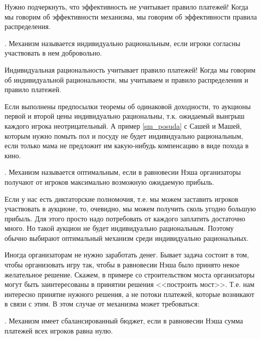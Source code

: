 Нужно подчеркнуть, что эффективность не учитывает правило платежей! Когда мы говорим об эффективности механизма, мы говорим об эффективности правила распределения.

\begin{mydef}
. Механизм называется индивидуально рациональным, если игроки согласны участвовать в нем добровольно. 
\end{mydef}

Индивидуальная рациональность учитывает правило платежей! Когда мы говорим об индивидуальной рациональности, мы учитываем и правило распределения и правило платежей.

\begin{myex} Если выполнены предпосылки теоремы об одинаковой доходности, то аукционы первой и второй цены индивидуально рациональны, т.к. ожидаемый выигрыш каждого игрока неотрицательный. А пример \ref{sm_posuda} с Сашей и Машей, которым нужно помыть пол и посуду не будет индивидуально рациональным, если только мама не предложит им какую-нибудь компенсацию в виде похода в кино.
\end{myex}

\begin{mydef} . Механизм называется оптимальным, если в равновесии Нэша организаторы получают от игроков максимально возможную ожидаемую прибыль.
\end{mydef}

Если у нас есть диктаторские полномочия, т.е. мы можем заставить игроков участвовать в аукционе, то, очевидно, мы можем получить сколь угодно большую прибыль. Для этого просто надо потребовать от каждого заплатить достаточно много. Но такой аукцион не будет индивидуально рациональным. Поэтому обычно выбирают оптимальный механизм среди индивидуально рациональных.

Иногда организаторам не нужно заработать денег. Бывает задача состоит в том, чтобы организовать игру так, чтобы в равновесии Нэша было принято некое желательное решение. Скажем, в примере со строительством моста организаторы могут быть заинтересованы в принятии решения <<построить мост>>. Т.е. нам интересно принятие нужного решения, а не потоки платежей, которые возникают в связи с этим. В этом случае от механизма может требоваться:

\begin{mydef} . Механизм имеет сбалансированный бюджет, если в равновесии Нэша сумма платежей всех игроков равна нулю.
\end{mydef}

